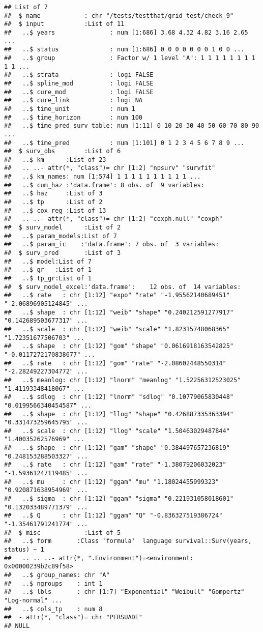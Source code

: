 \documentclass[
]{article}
\begin{document}
\begin{verbatim}
## List of 7
##  $ name            : chr "/tests/testthat/grid_test/check_9"
##  $ input           :List of 11
##   ..$ years               : num [1:686] 3.68 4.32 4.82 3.16 2.65 ...
##   ..$ status              : num [1:686] 0 0 0 0 0 0 0 1 0 0 ...
##   ..$ group               : Factor w/ 1 level "A": 1 1 1 1 1 1 1 1 1 1 ...
##   ..$ strata              : logi FALSE
##   ..$ spline_mod          : logi FALSE
##   ..$ cure_mod            : logi FALSE
##   ..$ cure_link           : logi NA
##   ..$ time_unit           : num 1
##   ..$ time_horizon        : num 100
##   ..$ time_pred_surv_table: num [1:11] 0 10 20 30 40 50 60 70 80 90 ...
##   ..$ time_pred           : num [1:101] 0 1 2 3 4 5 6 7 8 9 ...
##  $ surv_obs        :List of 6
##   ..$ km      :List of 23
##   .. ..- attr(*, "class")= chr [1:2] "npsurv" "survfit"
##   ..$ km_names: num [1:574] 1 1 1 1 1 1 1 1 1 1 ...
##   ..$ cum_haz :'data.frame': 8 obs. of  9 variables:
##   ..$ haz     :List of 3
##   ..$ tp      :List of 2
##   ..$ cox_reg :List of 13
##   .. ..- attr(*, "class")= chr [1:2] "coxph.null" "coxph"
##  $ surv_model      :List of 2
##   ..$ param_models:List of 7
##   ..$ param_ic    :'data.frame': 7 obs. of  3 variables:
##  $ surv_pred       :List of 3
##   ..$ model:List of 7
##   ..$ gr   :List of 1
##   ..$ tp_gr:List of 1
##  $ surv_model_excel:'data.frame':    12 obs. of  14 variables:
##   ..$ rate   : chr [1:12] "expo" "rate" "-1.95562140689451" "-2.06896905124845" ...
##   ..$ shape  : chr [1:12] "weib" "shape" "0.240212591277917" "0.142689503677317" ...
##   ..$ scale  : chr [1:12] "weib" "scale" "1.82315748068365" "1.72351677506703" ...
##   ..$ shape  : chr [1:12] "gom" "shape" "0.0616918163542825" "-0.0117272170838677" ...
##   ..$ rate   : chr [1:12] "gom" "rate" "-2.08602448550314" "-2.28249227304772" ...
##   ..$ meanlog: chr [1:12] "lnorm" "meanlog" "1.52256312523025" "1.41193348418067" ...
##   ..$ sdlog  : chr [1:12] "lnorm" "sdlog" "0.10779065830448" "0.0199566340454587" ...
##   ..$ shape  : chr [1:12] "llog" "shape" "0.426887335363394" "0.331473259645795" ...
##   ..$ scale  : chr [1:12] "llog" "scale" "1.50463029487844" "1.40035262576969" ...
##   ..$ shape  : chr [1:12] "gam" "shape" "0.384497657236819" "0.248153288503327" ...
##   ..$ rate   : chr [1:12] "gam" "rate" "-1.38079206032023" "-1.59361247119485" ...
##   ..$ mu     : chr [1:12] "ggam" "mu" "1.18024455999323" "0.920871638954969" ...
##   ..$ sigma  : chr [1:12] "ggam" "sigma" "0.221931058018601" "0.132033489771379" ...
##   ..$ Q      : chr [1:12] "ggam" "Q" "-0.836327519386724" "-1.35461791241774" ...
##  $ misc            :List of 5
##   ..$ form       :Class 'formula'  language survival::Surv(years, status) ~ 1
##   .. .. ..- attr(*, ".Environment")=<environment: 0x00000239b2c89f58> 
##   ..$ group_names: chr "A"
##   ..$ ngroups    : int 1
##   ..$ lbls       : chr [1:7] "Exponential" "Weibull" "Gompertz" "Log-normal" ...
##   ..$ cols_tp    : num 8
##  - attr(*, "class")= chr "PERSUADE"
## NULL
\end{verbatim}
\end{document}
